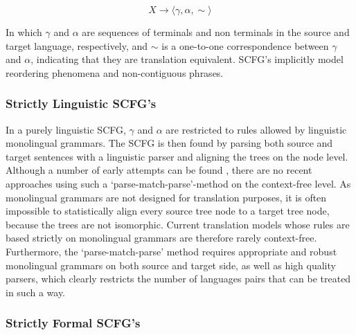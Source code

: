 \documentclass[a4paper, 11pt]{report}
\theoremstyle{definition}
\theoremstyle{plain}
\begin{document}
\[
X \to \langle \gamma , \alpha , \sim \rangle
\]

In which $\gamma$ and $\alpha$ are sequences of terminals and non terminals in the source and target language, respectively, and $\sim$ is a one-to-one correspondence between $\gamma$ and $\alpha$, indicating that they are translation equivalent. SCFG's implicitly model reordering phenomena and non-contiguous phrases.

\subsubsection{Strictly Linguistic SCFG's}

In a purely linguistic SCFG, $\gamma$ and $\alpha$ are restricted to rules allowed by linguistic monolingual grammars. The SCFG is then found by parsing both source and target sentences with a linguistic parser and aligning the trees on the node level. Although a number of early attempts can be found \citep[see][p. 20]{wu1997stochastic}, there are no recent approaches using such a `parse-match-parse'-method on the context-free level. As monolingual grammars are not designed for translation purposes, it is often impossible to statistically align every source tree node to a target tree node, because the trees are not isomorphic. Current translation models whose rules are based strictly on monolingual grammars are therefore rarely context-free. Furthermore, the `parse-match-parse' method requires appropriate and robust monolingual grammars on both source and target side, as well as high quality parsers, which clearly restricts the number of languages pairs that can be treated in such a way.

\subsubsection{Strictly Formal SCFG's}
\end{document}
